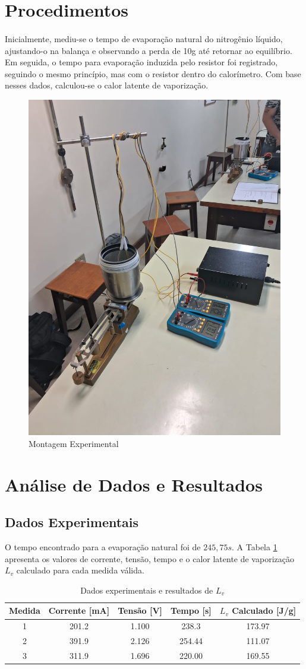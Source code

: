 \documentclass[brazilian,12pt,a4paper,final]{article}
\begin{document}
\newpage
\section{Procedimentos}
\paragraph{}
Inicialmente, mediu-se o tempo de evaporação natural do nitrogênio líquido, ajustando-o na balança e observando a perda de 10g até retornar ao equilíbrio. Em seguida, o tempo para evaporação induzida pelo resistor foi registrado, seguindo o mesmo princípio, mas com o resistor dentro do calorímetro. Com base nesses dados, calculou-se o calor latente de vaporização.

\begin{figure}[!htb]
    \centering
    \includegraphics[width=0.45\linewidth]{montagem3.png}
    \caption{Montagem Experimental}
    \label{fig:enter-label}
\end{figure}
\section{Análise de Dados e Resultados}
\subsection*{Dados Experimentais}
O tempo encontrado para a evaporação natural foi de $245,75s$. A Tabela \ref{tab:dados} apresenta os valores de corrente, tensão, tempo e o calor latente de vaporização $L_v$ calculado para cada medida válida.

\begin{table}[!htb]
    \centering
    \caption{Dados experimentais e resultados de $L_v$}
    \label{tab:dados}
    \begin{tabular}{|c|c|c|c|c|}
        \hline
        \textbf{Medida} & \textbf{Corrente [mA]} & \textbf{Tensão [V]} & \textbf{Tempo [s]} & \textbf{$L_v$ Calculado [J/g]} \\ \hline
        1 & 201.2 & 1.100 & 238.3 & 173.97 \\ \hline
        2 & 391.9 & 2.126 & 254.44 & 111.07 \\ \hline
        3 & 311.9 & 1.696 & 220.00 & 169.55 \\ \hline
    \end{tabular}
\end{table}
\newpage
\end{document}

